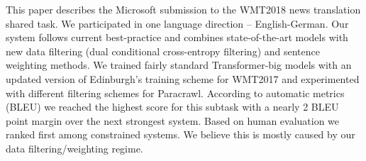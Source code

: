 This paper describes the Microsoft submission to the WMT2018 news translation shared task. We  participated in one language direction -- English-German. Our system follows current best-practice and combines state-of-the-art models with new data filtering (dual conditional cross-entropy filtering) and sentence weighting methods. We trained fairly standard Transformer-big models with an updated version of Edinburgh's training scheme for WMT2017 and experimented with different filtering schemes for Paracrawl. According to automatic metrics (BLEU) we reached the highest score for this subtask with a nearly 2 BLEU point margin over the next strongest system. Based on human evaluation we ranked first among constrained systems. We believe this is mostly caused by our data filtering/weighting regime.
